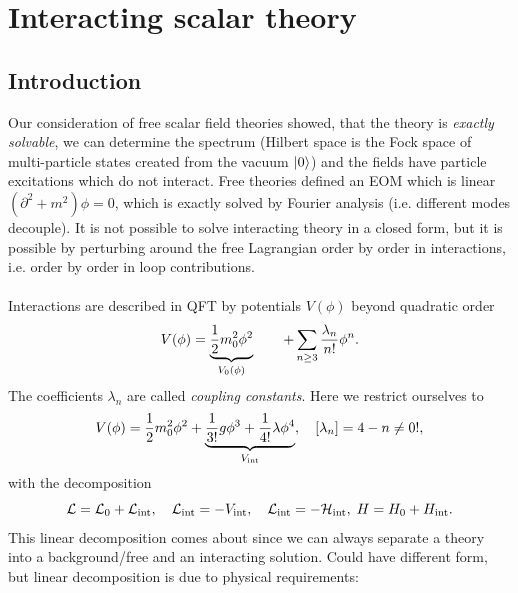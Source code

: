 \newpage





\section{Interacting scalar theory}
\subsection{Introduction}
Our consideration of free scalar field theories showed, that the theory is \emph{exactly solvable}, we can determine the spectrum (Hilbert space is the Fock space of multi-particle states created from the vacuum $\ket{0}$) and the fields have particle excitations which do not interact. Free theories defined an EOM which is linear $(\partial^2+m^2) \phi=0$, which is exactly solved by Fourier analysis (i.e. different modes decouple). It is not possible to solve interacting theory in a closed form, but it is possible by perturbing around the free Lagrangian order by order in interactions, i.e. order by order in loop contributions.\\
\\
Interactions are described in QFT by potentials $V(\phi)$ beyond quadratic order
\begin{equation}
	V(\phi) = \underbrace{\frac{1}{2} m^2_0 \phi^2}_{V_0 (\phi)} \qquad + \sum_{n\geq 3} \frac{\lambda_n}{n!} \phi^n.
\end{equation}
The coefficients $\lambda_n$ are called \emph{coupling constants}. Here we restrict ourselves to
\begin{equation}
V(\phi) = \frac{1}{2} m^2_0 \phi^2 +\underbrace{\frac{1}{3!} g \phi^3+\frac{1}{4!} \lambda \phi^4}_{V_{\mathrm{int}}},\quad [\lambda_n]=4-n \neq 0 !,
\end{equation}
with the decomposition 
\begin{equation}
	\mathcal{L}=\mathcal{L}_0 +\mathcal{L}_{\mathrm{int}},\quad \mathcal{L}_{\mathrm{int}}=-V_{\mathrm{int}}, \quad  \mathcal{L}_{\mathrm{int}}=-\mathcal{H}_{\mathrm{int}},\; H=H_0 +H_{\mathrm{int}}.
\end{equation}
This linear decomposition comes about since we can always separate a theory into a background/free and an interacting solution. Could have different form, but linear decomposition is due to physical requirements:
